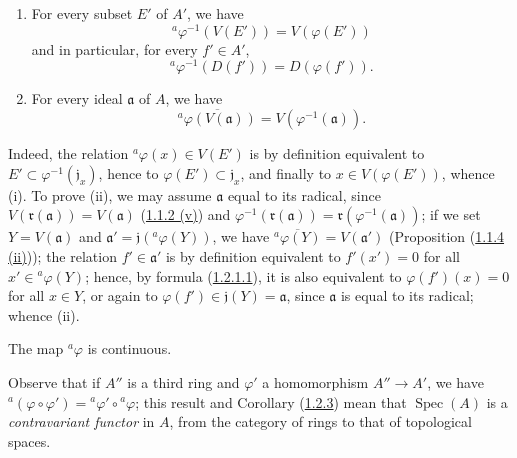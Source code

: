 \begin{proposition}[1.2.2]
\label{I.1.2.2}
\begin{enumerate}
  \item[\rm(i)] For every subset $E'$ of $A'$, we have
  \begin{equation}
    {}^a\varphi^{-1}(V(E'))=V(\varphi(E'))
    \tag{1.2.2.1}\label{I.1.2.2.1}
  \end{equation}
  and in particular, for every $f'\in A'$,
  \begin{equation}
    {}^a\varphi^{-1}(D(f'))=D(\varphi(f')).
    \tag{1.2.2.2}\label{I.1.2.2.2}
  \end{equation}
  \item[\rm(ii)] For every ideal $\mathfrak{a}$ of $A$, we have
  \begin{equation}
    \overline{{}^a\varphi(V(\mathfrak{a}))}
    =V(\varphi^{-1}(\mathfrak{a})).
    \tag{1.2.2.3}\label{I.1.2.2.3}
  \end{equation}
\end{enumerate}
\end{proposition}

Indeed, the relation ${}^a\varphi(x)\in V(E')$ is by definition
equivalent to $E'\subset\varphi^{-1}(\mathfrak{j}_x)$, hence to
$\varphi(E')\subset\mathfrak{j}_x$, and finally to
$x\in V(\varphi(E'))$, whence (i). To prove (ii), we may assume
$\mathfrak{a}$ equal to its radical, since
$V(\mathfrak{r}(\mathfrak{a}))=V(\mathfrak{a})$
(\hyperref[I.1.1.2]{1.1.2 (v)}) and
$\varphi^{-1}(\mathfrak{r}(\mathfrak{a}))
=\mathfrak{r}(\varphi^{-1}(\mathfrak{a}))$; if we set
$Y=V(\mathfrak{a})$ and
$\mathfrak{a}'=\mathfrak{j}({}^a\varphi(Y))$, we have
$\overline{{}^a\varphi(Y)}=V(\mathfrak{a}')$ (Proposition
(\hyperref[I.1.1.4]{1.1.4 (ii)})); the relation
$f'\in\mathfrak{a}'$ is by definition equivalent to $f'(x')=0$ for all
$x'\in{}^a\varphi(Y)$; hence, by formula
(\hyperref[I.1.2.1.1]{1.2.1.1}), it is also equivalent to
$\varphi(f')(x)=0$ for all $x\in Y$, or again to
$\varphi(f')\in\mathfrak{j}(Y)=\mathfrak{a}$, since $\mathfrak{a}$ is
equal to its radical; whence (ii).

\begin{corollary}[1.2.3]
\label{I.1.2.3}
The map ${}^a\varphi$ is continuous.
\end{corollary}

Observe that if $A''$ is a third ring and $\varphi'$ a homomorphism
$A''\to A'$, we have
${}^a(\varphi\circ\varphi')={}^a\varphi'\circ{}^a\varphi$; this result and
Corollary (\hyperref[I.1.2.3]{1.2.3}) mean that
$\operatorname{Spec}(A)$ is a \emph{contravariant functor} in $A$, from the
category of rings to that of topological spaces.

